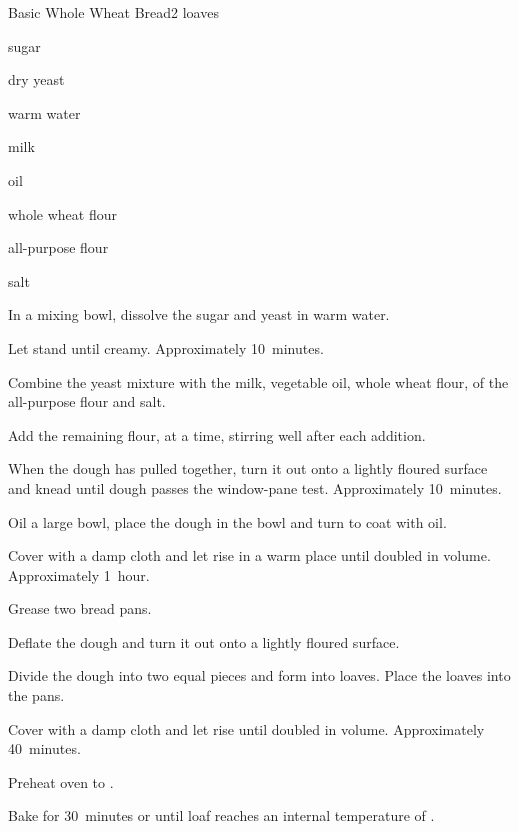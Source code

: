 \begin{recipe}{Basic Whole Wheat Bread}{}{2 loaves}

\begin{ingredients}
\item {} sugar
\item {} dry yeast
\item \C{\threequarter} warm water
\item \C{\quarter} milk
\item {} oil
\item {} whole wheat flour
\item {} all-purpose flour
\item {} salt
\end{ingredients}

\begin{directions}
\item In a mixing bowl, dissolve the sugar and yeast in warm water.
\item Let stand until creamy. Approximately 10~minutes.
\item Combine the yeast mixture with the milk, vegetable oil, whole wheat flour,  of the all-purpose flour and salt.
\item Add the remaining flour, \C{\half} at a time, stirring well after each addition.
\item When the dough has pulled together, turn it out onto a lightly floured surface and knead until dough passes the window-pane test. Approximately 10~minutes.
\item Oil a large bowl, place the dough in the bowl and turn to coat with oil.
\item Cover with a damp cloth and let rise in a warm place until doubled in volume. Approximately 1~hour.
\item Grease two bread pans.
\item Deflate the dough and turn it out onto a lightly floured surface.
\item Divide the dough into two equal pieces and form into loaves. Place the loaves into the pans.
\item Cover with a damp cloth and let rise until doubled in volume. Approximately 40~minutes.
\item Preheat oven to .
\item Bake for 30~minutes or until loaf reaches an internal temperature of .
\end{directions}
\end{recipe}
